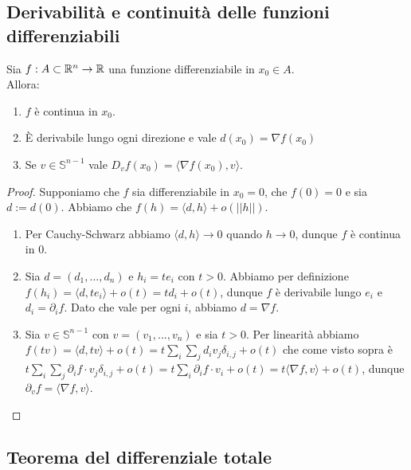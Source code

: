 \documentclass{article}
\begin{document}
\subsection{Derivabilità e continuità delle funzioni differenziabili}

\begin{theorem}{}{}
    Sia $f:A\subset \mathbb{R}^n \to \mathbb{R}$ una funzione differenziabile in $x_0 \in A$.\\
    Allora:\begin{enumerate}
        \item $f$ è continua in $x_0$.
        \item È derivabile lungo ogni direzione e vale $d(x_0) = \nabla f(x_0) $
        \item Se $v \in \mathbb{S}^{n-1}$ vale $D_v f(x_0) = \langle \nabla f(x_0), v\rangle$.
    \end{enumerate}
\end{theorem}
\begin{proof}
    Supponiamo che $f$ sia differenziabile in $x_0=0$, che $f(0)=0$ e sia $d := d(0)$. Abbiamo che $f(h)= \langle d, h\rangle + o(||h||)$. \begin{enumerate}
        \item Per Cauchy-Schwarz abbiamo $\langle d, h\rangle\to 0$ quando $h\to 0$, dunque $f$ è continua in $0$.
        \item  Sia $d = (d_1,...,d_n)$ e $h_i = te_i$ con $t> 0$. Abbiamo per definizione $f(h_i)= \langle d, te_i\rangle + o(t) = td_i + o(t)$, dunque $f$ è derivabile lungo $e_i$ e $d_i = \partial_i f$. Dato che vale per ogni $i$, abbiamo $d = \nabla f$.
        \item Sia $v\in \mathbb{S}^{n-1}$ con $v = (v_1,...,v_n)$ e sia $t>0$. Per linearità abbiamo $f(tv) = \langle d,tv\rangle + o(t) = t\sum_i \sum_j d_i v_j \delta_{i,j} + o(t)$ che come visto sopra è $t\sum_i\sum_j\partial_i f \cdot v_j \delta_{i,j} + o(t) = t\sum_i \partial_i f \cdot v_i + o(t)= t\langle\nabla f, v \rangle + o(t)$, dunque $\partial_v f = \langle\nabla f, v \rangle$. 
    \end{enumerate}
\end{proof}

\subsection{Teorema del differenziale totale}
\end{document}
